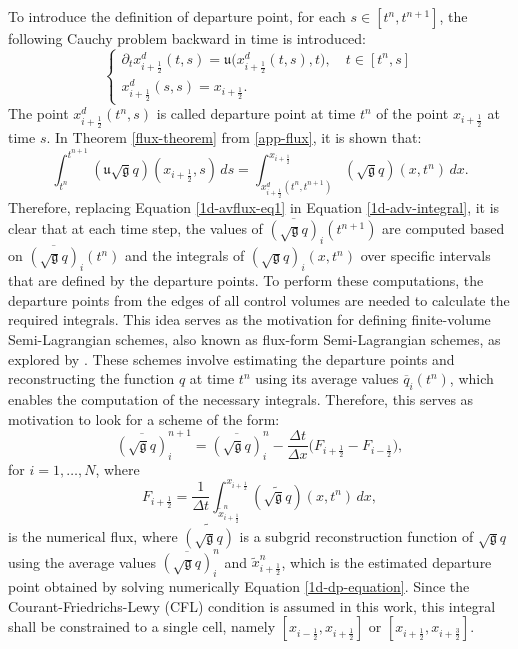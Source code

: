 \documentclass[preprint,12pt]{elsarticle}
\begin{document}
\begin{linenumbers}
To introduce the definition of departure point, for each $s \in [t^n,t^{n+1}]$,
the following Cauchy problem backward in time is introduced:
\begin{equation}
	\label{1d-dp-equation}
	\begin{cases}
		{\partial_t} x_{i+\frac{1}{2}}^d(t,s) = \mathfrak{u}\big(  x_{i+\frac{1}{2}}^d(t,s),t\big),\quad t\in[t^{n},s] \\
		x_{i+\frac{1}{2}}^d(s,s) = x_{i+\frac{1}{2}}.
	\end{cases}
\end{equation}
The point $ x_{i+\frac{1}{2}}^d(t^n,s)$ is called departure point at time $t^n$
of the point $x_{i+\frac{1}{2}}$ at time $s$.
In Theorem \ref{flux-theorem} from \ref{app-flux}, it is shown that:
\begin{equation}
	\label{1d-avflux-eq1}
	\int_{t^n}^{t^{n+1}} (\mathfrak{u}\sqrt{\mathfrak{g}}q)(x_{i+\frac{1}{2}}, s) \,ds = 
	\int^{x_{i+\frac{1}{2}}}_{ x_{i+\frac{1}{2}}^d(t^n,t^{n+1})} (\sqrt{\mathfrak{g}}q)(x,t^n)\,dx.
\end{equation}
Therefore, replacing Equation \eqref{1d-avflux-eq1} in Equation \eqref{1d-adv-integral},
it is clear that at each time step, the values of $\overline{(\mathfrak{\sqrt{g}}q)}_{i}(t^{n+1})$ are computed based on $\overline{(\mathfrak{\sqrt{g}}q)}_{i}(t^{n})$  and the integrals 
of ${(\mathfrak{\sqrt{g}}q)}_{i}(x,t^n)$ over specific intervals that are defined by the departure points.
To perform these computations, the departure points from the edges of all control volumes are needed to calculate the required integrals.
This idea serves as the motivation for defining finite-volume Semi-Lagrangian schemes, also known as flux-form Semi-Lagrangian schemes, as explored by \cite{lin:1996}.
These schemes involve estimating the departure points and reconstructing the function $q$ at time $t^n$ using its average values $\overline{q}_{i}(t^n)$, which enables the computation of the necessary integrals.
Therefore, this serves as motivation to look for a scheme of the form:
\begin{equation}
	\label{fv-scheme}
	\overline{(\sqrt{\mathfrak{g}}q)}^{n+1}_{i} = \overline{(\sqrt{\mathfrak{g}}q)}^{n}_{i} - \frac{\Delta t}{\Delta x}
	\bigg({F}_{i+\frac{1}{2}}-{F}_{i-\frac{1}{2}}\bigg),
\end{equation}
for $i=1,\ldots,N$,
where 
\begin{equation}
	\label{numerical-flux}
	{F}_{i+\frac{1}{2}} =
	 \frac{1}{\Delta t}\int_{\tilde{x}_{i+\frac{1}{2}}^n}
	 ^{x_{i+\frac{1}{2}}}
	 (\widetilde{\sqrt{\mathfrak{g}}{q}})(x, t^n) \,dx,
\end{equation} 
is the numerical flux, where $\widetilde{(\sqrt{\mathfrak{g}}{q})}$ is a subgrid reconstruction function of $\sqrt{\mathfrak{g}}{q}$ using the average values $\overline{(\sqrt{\mathfrak{g}}q)}^{n}_{i}$ and $\tilde{x}_{i+\frac{1}{2}}^n$, which is the estimated departure point obtained by solving numerically Equation \eqref{1d-dp-equation}.
Since the Courant-Friedrichs-Lewy (CFL) condition is assumed in this work, this integral shall be constrained to a single cell, namely $[x_{i-\frac{1}{2}},x_{i+\frac{1}{2}}]$ or $[x_{i+\frac{1}{2}},x_{i+\frac{3}{2}}]$.


\end{linenumbers}
\end{document}
